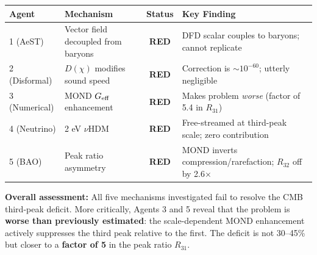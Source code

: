 \documentclass[11pt,a4paper]{article}
\newcommand{\RED}{\textcolor{dfdred}{\textbf{RED}}}
\begin{document}
\begin{center}
\begin{tabular}{llcl}
\toprule
\textbf{Agent} & \textbf{Mechanism} & \textbf{Status} & \textbf{Key Finding} \\
\midrule
1 (AeST) & Vector field decoupled from baryons & \RED & DFD scalar couples to baryons; cannot replicate \\
2 (Disformal) & $D(\chi)$ modifies sound speed & \RED & Correction is $\sim 10^{-60}$; utterly negligible \\
3 (Numerical) & MOND $G_{\rm eff}$ enhancement & \RED & Makes problem \emph{worse} (factor of 5.4 in $R_{31}$) \\
4 (Neutrino) & 2 eV $\nu$HDM & \RED & Free-streamed at third-peak scale; zero contribution \\
5 (BAO) & Peak ratio asymmetry & \RED & MOND inverts compression/rarefaction; $R_{32}$ off by 2.6$\times$ \\
\bottomrule
\end{tabular}
\end{center}

\textbf{Overall assessment:} All five mechanisms investigated fail to resolve the CMB third-peak deficit. More critically, Agents 3 and 5 reveal that the problem is \textbf{worse than previously estimated}: the scale-dependent MOND enhancement actively suppresses the third peak relative to the first. The deficit is not 30--45\% but closer to a \textbf{factor of 5} in the peak ratio $R_{31}$.
\end{document}
